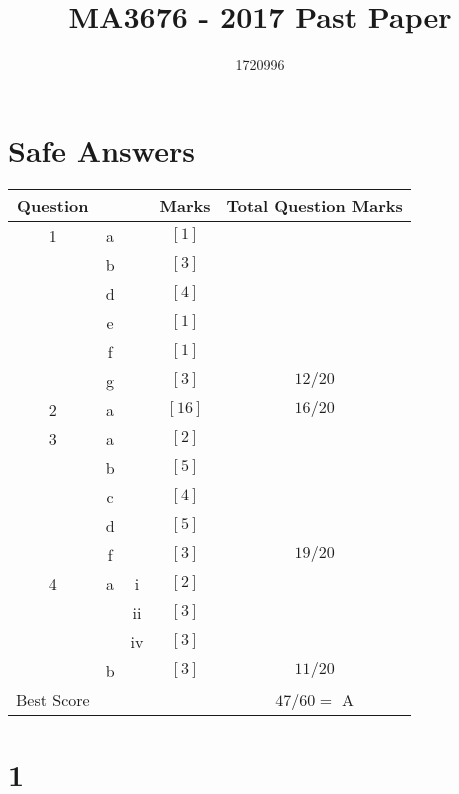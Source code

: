 \documentclass{article}
\title{MA3676 -  2017 Past Paper}
\author{1720996}
\begin{document}
\maketitle

\tableofcontents

\pagebreak

\section{Safe Answers}
\begin{table}[h]
    \centering
    \begin{tabular}{|c|c|c|c|c|}
        \hline
        Question & & & Marks & Total Question Marks\\
        \hline
        1 & a & & $[1]$ &  \\
         & b & & $[3]$ & \\
         & d & & $[4]$ & \\
         & e & & $[1]$ & \\
         & f & & $[1]$ & \\
         & g & & $[3]$ & $12/20$ \\
         \hline
        2 & a & & $[16]$ & $16/20$ \\
        \hline
        3 & a & & $[2]$ & \\
         & b & & $[5]$ & \\
         & c & & $[4]$ & \\
         & d & & $[5]$ & \\
         & f & & $[3]$ & $19/20$ \\
         \hline
        4 & a & i & $[2]$ & \\
        & & ii & $[3]$ & \\
        & & iv & $[3]$ & \\
        & b & & $[3]$ & $11/20$ \\
        \hline
        Best Score & & & & $47/60=$ A\\
        \hline
    \end{tabular}
    \label{tab:safe}
\end{table}

\section{1}
\end{document}
